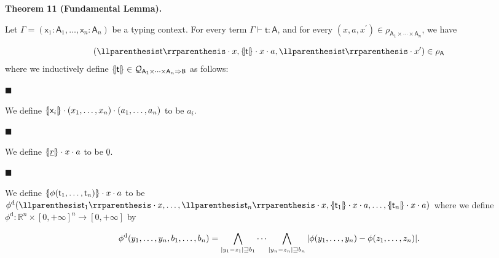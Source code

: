 \documentclass[10pt,a4paper]{amsart}
\begin{document}
 
 
\par\medskip\noindent\textbf{Theorem 11 (Fundamental Lemma).}\par
 
 
Let $\mathsf{\Gamma}=(\mathsf{x}_{1}:\mathsf{A}_{1},\ldots,\mathsf{x}_{n}:\mathsf{A%
}_{n})$ be a typing context. For every term $\mathsf{\Gamma}\vdash\mathsf{t}:\mathsf{A}$, and for every $(x,a,x^{\prime})\in\rho_{\mathsf{A}_{1}\times\cdots\times\mathsf{A}_{n}}$, we have\par
    \[(\llparenthesis\mathsf{t}\rrparenthesis\cdot x,\{\hskip-2.25pt|\mathsf{t}|%
\hskip-2.25pt\}\cdot x\cdot a,\llparenthesis\mathsf{t}\rrparenthesis\cdot x^{%
\prime})\in\rho_{{\mathsf{A}}}\]    
where we inductively define $\{\hskip-2.25pt|\mathsf{t}|\hskip-2.25pt\}\in\mathcal{Q}_{\mathsf{A}_{1}\times%
\cdots\times\mathsf{A}_{n}\Rightarrow\mathsf{B}}$ as follows:\par
  
\par\noindent  $\blacksquare$ 
 
We define $\{\hskip-2.25pt|\mathsf{x}_{i}|\hskip-2.25pt\}\cdot(x_{1},\ldots,x_{n})\cdot(a%
_{1},\ldots,a_{n})$ to be $a_{i}.$\par
 
 
 
\par\noindent  $\blacksquare$ 
 
We define $\{\hskip-2.25pt|\underline{r}|\hskip-2.25pt\}\cdot x\cdot a$ to be $\underline{0}.$\par
 
 
 
\par\noindent  $\blacksquare$ 
 
We define $\{\hskip-2.25pt|\phi(\mathsf{t}_{1},\ldots,\mathsf{t}_{n})|\hskip-2.25pt\}%
\cdot x\cdot a$ to be $\phi^{\mathrm{d}}(\llparenthesis\mathsf{t}_{1}\rrparenthesis\cdot x,\ldots,%
\llparenthesis\mathsf{t}_{n}\rrparenthesis\cdot x,\{\hskip-2.25pt|\mathsf{t}_{%
1}|\hskip-2.25pt\}\cdot x\cdot a,\ldots,\{\hskip-2.25pt|\mathsf{t}_{n}|\hskip-%
2.25pt\}\cdot x\cdot a)$ where we define $\phi^{\mathrm{d}}\colon\mathbb{R}^{n}\times[0,+\infty]^{n}\to[0,+\infty]$ by\par
    \[\phi^{\mathrm{d}}(y_{1},\ldots,y_{n},b_{1},\ldots,b_{n})=\bigwedge_{|y_{1}-z_{%
1}|\sqsupseteq b_{1}}\cdots\bigwedge_{|y_{n}-z_{n}|\sqsupseteq b_{n}}|\phi(y_{%
1},\ldots,y_{n})-\phi(z_{1},\ldots,z_{n})|.\]    
 
\end{document}
